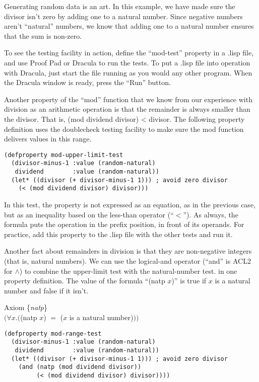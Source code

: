 Generating random data is an art.
In this example, we have made sure the divisor isn't zero
by adding one to a natural number. Since negative numbers
aren't ``natural'' numbers, we know that adding one
to a natural number ensures that the sum is non-zero.

To see the testing facility in action,
define the ``mod-test'' property in a .lisp file,
and use Proof Pad or Dracula to run the tests.
To put a .lisp file into operation with Dracula,
just start the file running as you would any other program.
When the Dracula window is ready,
press the ``Run'' button.

Another property of the ``mod'' function that we know from our experience
with division as an arithmetic operation is that the remainder
is always smaller than the divisor.
That is, (mod dividend divisor) < divisor.
The following property definition uses
the doublecheck testing facility
to make sure the mod function delivers values in this range.

\begin{lstlisting}
(defproperty mod-upper-limit-test
  (divisor-minus-1 :value (random-natural)
   dividend        :value (random-natural))
  (let* ((divisor (+ divisor-minus-1 1))) ; avoid zero divisor
    (< (mod dividend divisor) divisor)))
\end{lstlisting}

In this test, the property is not expressed as an equation,
as in the previous case, but as an inequality
based on the less-than operator (``$<$'').
As always, the formula puts the operation in the prefix position,
in front of its operands.
For practice, add this property to the .lisp file with the other tests and run it.

Another fact about remainders in division is that
they are non-negative integers (that is, natural numbers).
We can use the logical-and operator (``and'' is ACL2 for $\wedge$)
to combine the upper-limit test with the natural-number test.
in one property definition.
\label{natp-op}
The value of the formula ``(natp $x$)'' is true
if $x$ is a natural number and false if it isn't.

\label{natp-axiom-formal}
\begin{center}
Axiom \{\emph{natp}\} \\
$(\forall x.($(natp $x$) $=$ ($x$ is a natural number)$))$
\end{center}

\begin{lstlisting}
(defproperty mod-range-test
  (divisor-minus-1 :value (random-natural)
   dividend        :value (random-natural))
  (let* ((divisor (+ divisor-minus-1 1))) ; avoid zero divisor
    (and (natp (mod dividend divisor))
         (< (mod dividend divisor) divisor))))
\end{lstlisting}

